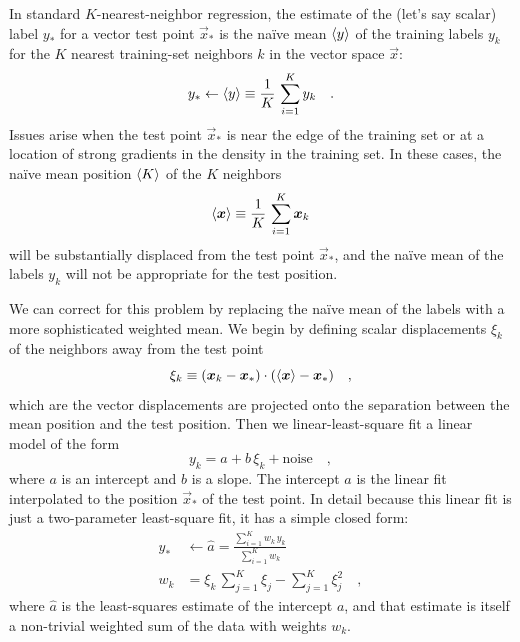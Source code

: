 \documentclass[modern]{aastex63}
\begin{document}
In standard $K$-nearest-neighbor regression, the estimate of the
(let's say scalar) label $y_\ast$ for a vector test point
$\vec{x}_\ast$ is the na\"ive mean $\left\langle y \right\rangle$ of the training labels $y_k$ for the $K$
nearest training-set neighbors $k$ in the vector space $\vec{x}$:
\begin{equation}
  y_\ast \leftarrow \mean{y} \equiv \frac{1}{K}\,\sum_{i=1}^K y_k
  \quad .
\end{equation}
Issues arise when the test point $\vec{x}_\ast$ is near the edge of
the training set or at a location of strong gradients in the density
in the training set.
In these cases, the na\"ive mean position $\left\langle K \right\rangle$ of the $K$ neighbors
\begin{equation}
  \mean{\vec{x}} \equiv \frac{1}{K}\,\sum_{i=1}^K \vec{x}_k
\end{equation}
will be substantially displaced from the test point $\vec{x}_\ast$, and
the na\"ive mean of the labels $y_k$ will not be appropriate for the
test position.

We can correct for this problem by replacing the na\"ive mean of the labels
with a more sophisticated weighted mean.
We begin by defining scalar displacements $\xi_k$ of the neighbors away
from the test point
\begin{equation}
  \xi_k \equiv (\vec{x}_k - \vec{x}_\ast)\cdot(\mean{\vec{x}} - \vec{x}_\ast)
  \quad ,
\end{equation}
which are the vector displacements are projected onto the separation between
the mean position and the test position.
Then we linear-least-square fit a linear model of the form
\begin{equation}
  y_k = a + b\,\xi_k + \mbox{noise}
  \quad ,
\end{equation}
where $a$ is an intercept and $b$ is a slope.
The intercept $a$ is the linear
fit interpolated to the position $\vec{x}_\ast$ of the test point.
In detail because this linear fit is just a two-parameter least-square fit,
it has a simple closed form:
\begin{align}
  y_\ast & \leftarrow \hat{a} = \frac{\sum_{i=1}^K w_k\,y_k}{\sum_{i=1}^K w_k}
  \\
  w_k & = \xi_k\,\sum_{j=1}^K \xi_j - \sum_{j=1}^K \xi_j^2
  \quad ,
\end{align}
where $\hat{a}$ is the least-squares estimate of the intercept $a$, and that
estimate is itself a non-trivial weighted sum of the data with weights $w_k$.



\end{document}
